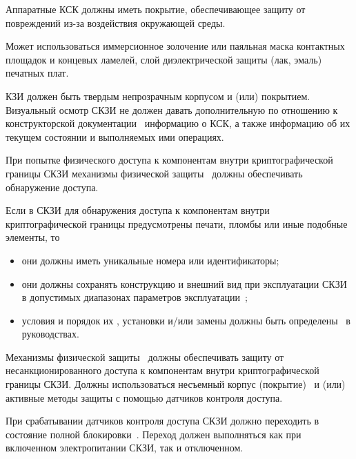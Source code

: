 \label{R.PS.Passivation} %
Аппаратные КСК должны иметь покрытие, обеспечивающее защиту от 
повреждений из-за воздействия окружающей среды. 

\begin{note*}
Может использоваться иммерсионное золочение или паяльная маска 
контактных площадок и концевых ламелей, слой диэлектрической защиты 
(лак, эмаль) печатных плат.
\end{note*}
\fi


\label{R.PS.Coating} %
КЗИ должен быть 
твердым непрозрачным корпусом и (или) покрытием.
%
Визуальный осмотр СКЗИ не должен давать дополнительную по отношению 
к конструкторской документации~ информацию о КСК, 
а также информацию об их текущем состоянии и выполняемых ими операциях.


\label{R.PS.PassiveDetection} %
При попытке физического доступа к компонентам внутри 
криптографической границы СКЗИ механизмы физической защиты~ 
должны обеспечивать обнаружение доступа. 

\label{R.PS.PassiveDetectionId} %
Если в СКЗИ для обнаружения доступа к компонентам внутри криптографической 
границы предусмотрены печати, пломбы или иные подобные элементы, то 
\begin{itemize}
\item
они должны иметь уникальные номера или идентификаторы;
\item
они должны сохранять конструкцию и внешний вид при эксплуатации СКЗИ в допустимых 
диапазонах параметров эксплуатации~;
\item
условия и порядок их , установки и/или замены
должны быть определены~ в руководствах.
\end{itemize}


\label{R.PS.ActiveDetectionSensor} %
Механизмы физической защиты~ должны обеспечивать 
защиту от несанкционированного доступа к компонентам внутри 
криптографической границы СКЗИ. 
%
Должны использоваться несъемный корпус (покрытие)~ 
и (или) активные методы защиты с помощью датчиков контроля доступа.

\label{R.PS.Erasing} %
При срабатывании датчиков контроля доступа СКЗИ должно 
переходить в состояние полной блокировки~.
%
Переход должен выполняться как при включенном электропитании 
СКЗИ, так и отключенном.

